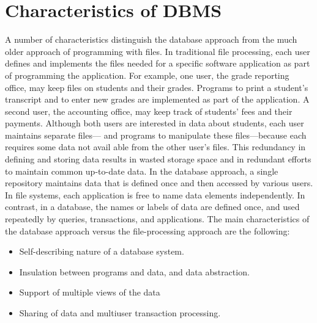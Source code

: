 \section{Characteristics of DBMS }
A number of characteristics distinguish the database approach from the much older approach of programming with files. In traditional file processing, each user defines and implements the files needed for a specific software application as part of programming the application. For example, one user, the grade reporting office, may keep files on students and their grades. Programs to print a student’s transcript and to enter new grades are implemented as part of the application. A second user, the accounting office, may keep track of students’ fees and their payments. Although both users are interested in data about students, each user maintains separate files— and programs to manipulate these files—because each requires some data not avail able from the other user’s files. This redundancy in defining and storing data results in wasted storage space and in redundant efforts to maintain common up-to-date data. In the database approach, a single repository maintains data that is defined once and then accessed by various users. In file systems, each application is free to name data elements independently. In contrast, in a database, the names or labels of data are defined once, and used repeatedly by queries, transactions, and applications. The main characteristics of the database approach versus the file-processing approach are the following:
\begin{itemize}
\item \textbf{} Self-describing nature of a database system.
\item \textbf{} Insulation between programs and data, and data abstraction. 
\item \textbf{} Support of multiple views of the data
\item \textbf{} Sharing of data and multiuser transaction processing.
\end{itemize}

